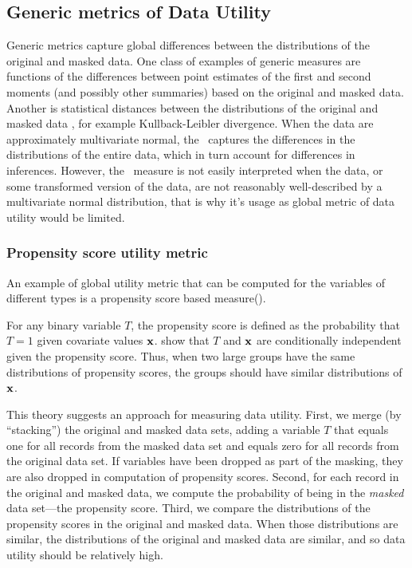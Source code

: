 \documentclass[12pt]{article}
\begin{document}
\subsection{Generic metrics of Data Utility}

Generic metrics capture global differences between the distributions of the original and masked data. 
One class of examples of generic measures are functions of the differences between point estimates of the first and second moments (and possibly other summaries) based on the original and masked data. Another is statistical distances between the distributions of the original and masked data \cite{dfks02, gks06}, for example Kullback-Leibler divergence.  When the data are approximately multivariate normal, the \KL\ captures the differences in the distributions of the entire data,
which in turn account for differences in inferences. 
However, the \KL\ measure is not easily
interpreted when the data, or some transformed version of the
data, are not reasonably well-described by a multivariate normal
distribution, that is why it's  usage as  global metric of data utility
would be limited.



\subsubsection{Propensity score utility metric}

An example of global utility metric that can be computed for the variables of different types is a propensity score based measure(\cite{propen}).

For any binary variable $T$, the propensity
score is defined as the probability that $T=1$ given covariate values $\textbf{x}$. \cite{rr83} show
that $T$ and $\textbf{x}$ are conditionally independent given the propensity
score. Thus, when two large groups have the same distributions of
propensity scores, the groups should have similar distributions of $\textbf{x}$.

This theory suggests an approach for measuring data utility.
First, we merge (by ``stacking'') the original and masked data sets, adding a variable $T$ that equals one for all records from the masked data set and equals zero for all records from the original data set. If
variables have been dropped as part of the masking, they are also
dropped in computation of propensity scores.  Second, for each record
in the original and masked data, we compute the probability of being
in the \textit{masked} data set---the propensity
score. Third, we compare the distributions of the propensity scores in
the original and masked data.  When those distributions are similar,
the distributions of the original and masked data are similar, and so
data utility should be relatively high.
\end{document}
